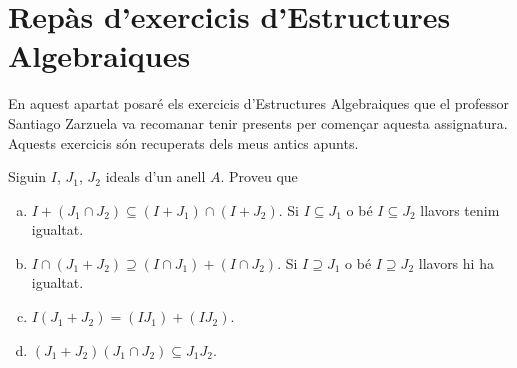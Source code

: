 \documentclass[../main.tex]{subfiles}
\begin{document}
\chapter{Repàs d'exercicis d'Estructures Algebraiques}

En aquest apartat posaré els exercicis d'Estructures Algebraiques que el professor Santiago Zarzuela va recomanar tenir presents per començar aquesta assignatura. Aquests exercicis són recuperats dels meus antics apunts.

\setcounter{exercici}{8}
\begin{exercici}\label{esal9}
Siguin $I$, $J_1$, $J_2$ ideals d'un anell $A$. Proveu que
\begin{enumerate}[(a)]
    \item $I+(J_1\cap J_2) \subseteq (I+J_1)\cap(I+J_2)$. Si $I\subseteq J_1$ o bé $I\subseteq J_2$ llavors tenim igualtat.
    \item $I\cap(J_1+J_2)\supseteq (I\cap J_1)+(I\cap J_2)$. Si $I \supseteq J_1$ o bé $I\supseteq J_2$ llavors hi ha igualtat.
    \item $I(J_1+J_2)=(IJ_1)+(IJ_2)$.
    \item $(J_1+J_2)(J_1\cap J_2) \subseteq J_1J_2$.
\end{enumerate}
\end{exercici}
\end{document}
